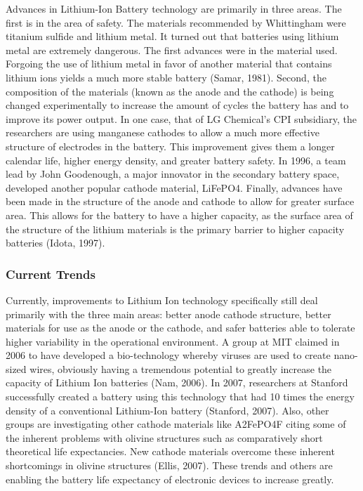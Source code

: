 \documentclass[12pt,oneside,letterpaper]{article}
\begin{document}
Advances in Lithium-Ion Battery technology are primarily in three areas.  The
first is in the area of safety.  The materials recommended by Whittingham were
titanium sulfide and lithium metal.  It turned out that batteries using lithium
metal are extremely dangerous.  The first advances were in the material used.
Forgoing the use of lithium metal in favor of another material that contains
lithium ions yields a much more stable battery (Samar, 1981).  Second, the
composition of the materials (known as the anode and the cathode) is being
changed experimentally to increase the amount of cycles the battery has and to
improve its power output.  In one case, that of LG Chemical's CPI subsidiary,
the researchers are using manganese cathodes to allow a much more effective
structure of electrodes in the battery.  This improvement gives them a longer
calendar life, higher energy density, and greater battery safety.  In 1996, a
team lead by John Goodenough, a major innovator in the secondary battery space,
developed another popular cathode material, LiFePO4.  Finally, advances have
been made in the structure of the anode and cathode to allow for greater surface
area.  This allows for the battery to have a higher capacity, as the surface
area of the structure of the lithium materials is the primary barrier to higher
capacity batteries (Idota, 1997).

\subsubsection{Current Trends}

Currently, improvements to Lithium Ion technology specifically still deal
primarily with the three main areas: better anode cathode structure, better
materials for use as the anode or the cathode, and safer batteries able to
tolerate higher variability in the operational environment.  A group at MIT
claimed in 2006 to have developed a bio-technology whereby viruses are used to
create nano-sized wires, obviously having a tremendous potential to greatly
increase the capacity of Lithium Ion batteries (Nam, 2006).  In 2007,
researchers at Stanford successfully created a battery using this technology
that had 10 times the energy density of a conventional Lithium-Ion battery
(Stanford, 2007).  Also, other groups are investigating other cathode materials
like A2FePO4F citing some of the inherent problems with olivine structures such
as comparatively short theoretical life expectancies.  New cathode materials
overcome these inherent shortcomings in olivine structures (Ellis, 2007).  These
trends and others are enabling the battery life expectancy of electronic devices
to increase greatly.
\end{document}
